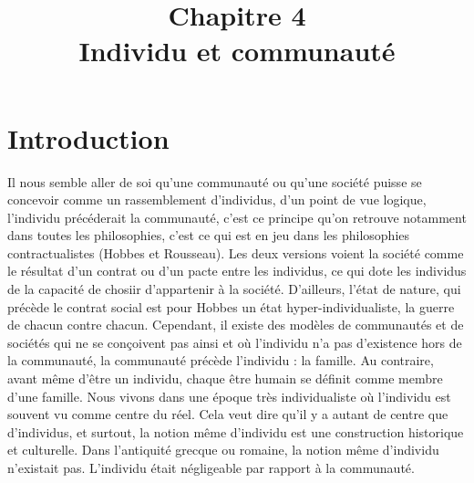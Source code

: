 \documentclass[12pt]{article}
\title{Chapitre 4\\\large{Individu et communauté}}
\date{}
\author{}
\begin{document}
\maketitle
\thispagestyle{fancy}

\fancyhead[L]{}

\section*{\color{red}Introduction}
Il nous semble aller de soi qu'une communauté ou qu'une société puisse se concevoir comme un rassemblement d'individus, d'un point de vue logique, l'individu précéderait la communauté, c'est ce principe qu'on retrouve notamment dans toutes les philosophies, c'est ce qui est en jeu dans les philosophies contractualistes (Hobbes et Rousseau).
Les deux versions voient la société comme le résultat d'un contrat ou d'un pacte entre les individus, ce qui dote les individus de la capacité de chosiir d'appartenir à la société.
D'ailleurs, l'état de nature, qui précède le contrat social est pour Hobbes un état hyper-individualiste, la guerre de chacun contre chacun.
Cependant, il existe des modèles de communautés et de sociétés qui ne se conçoivent pas ainsi et où l'individu n'a pas d'existence hors de la communauté, la communauté précède l'individu : la famille.
Au contraire, avant même d'être un individu, chaque être humain se définit comme membre d'une famille.
Nous vivons dans une époque très individualiste où l'individu est souvent vu comme centre du réel. 
Cela veut dire qu'il y a autant de centre que d'individus, et surtout, la notion même d'individu est une construction historique et culturelle.
Dans l'antiquité grecque ou romaine, la notion même d'individu n'existait pas.
L'individu était négligeable par rapport à la communauté.
\end{document}
